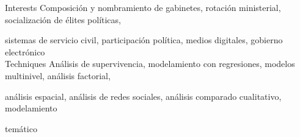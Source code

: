 





\begin{cvskills}

\cvskill
{Interests}
{Composición y nombramiento de gabinetes, rotación ministerial, socialización de élites políticas,}

\cvskill
{}
{sistemas de servicio civil, participación política, medios digitales, gobierno electrónico}\\

\cvskill
{Techniques} 
{Análisis de supervivencia, modelamiento con regresiones, modelos multinivel, análisis factorial,}

\cvskill
{} 
{análisis espacial, análisis de redes sociales, análisis comparado cualitativo, modelamiento} 

\cvskill
{} 
{temático} \\

\end{cvskills}
